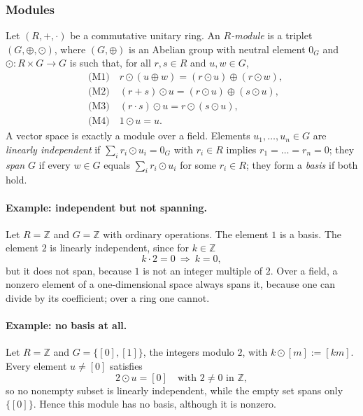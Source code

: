 \documentclass[11pt]{article}
\begin{document}
\subsubsection*{Modules}
Let $(R,+,\cdot)$ be a commutative unitary ring. An \emph{$R$-module} is a triplet $(G,\oplus,\odot)$, where $(G,\oplus)$ is an Abelian group with neutral element $0_G$ and $\odot:R\times G\to G$ is such that, for all $r,s\in R$ and $u,w\in G$,
\begin{align*}
&\text{(M1)}\quad r\odot(u\oplus w)=(r\odot u)\oplus(r\odot w),\\
&\text{(M2)}\quad (r+s)\odot u=(r\odot u)\oplus(s\odot u),\\
&\text{(M3)}\quad (r\cdot s)\odot u=r\odot(s\odot u),\\
&\text{(M4)}\quad 1\odot u=u.
\end{align*}
A vector space is exactly a module over a field. Elements $u_1,\dots,u_n\in G$ are \emph{linearly independent} if $\sum_ir_i\odot u_i=0_G$ with $r_i\in R$ implies $r_1=\dots=r_n=0$; they \emph{span} $G$ if every $w\in G$ equals $\sum_ir_i\odot u_i$ for some $r_i\in R$; they form a \emph{basis} if both hold.

\paragraph{Example: independent but not spanning.} Let $R=\mathbb Z$ and $G=\mathbb Z$ with ordinary operations. The element $1$ is a basis. The element $2$ is linearly independent, since for $k\in\mathbb Z$
\[
k\cdot2=0\ \Longrightarrow\ k=0,
\]
but it does not span, because $1$ is not an integer multiple of $2$. Over a field, a nonzero element of a one-dimensional space always spans it, because one can divide by its coefficient; over a ring one cannot.

\paragraph{Example: no basis at all.} Let $R=\mathbb Z$ and $G=\{[0],[1]\}$, the integers modulo $2$, with $k\odot[m]:=[km]$. Every element $u\neq[0]$ satisfies
\[
2\odot u=[0]\quad\text{with }2\neq0\text{ in }\mathbb Z,
\]
so no nonempty subset is linearly independent, while the empty set spans only $\{[0]\}$. Hence this module has no basis, although it is nonzero.
\end{document}
